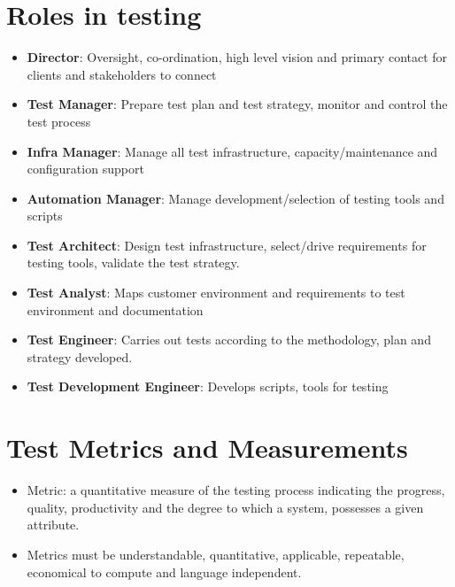 \documentclass{article}
\begin{document}
\section{Roles in testing}
\begin{itemize}
    \item \textbf{Director}: Oversight, co-ordination, high level vision and primary contact for clients and stakeholders to connect
    
    \item \textbf{Test Manager}: Prepare test plan and test strategy, monitor and control the test process
    
    \item \textbf{Infra Manager}: Manage all test infrastructure, capacity/maintenance and configuration support
    
    \item \textbf{Automation Manager}: Manage development/selection of testing tools and scripts
    
    \item \textbf{Test Architect}: Design test infrastructure, select/drive requirements for testing tools, validate the test strategy.
    
    \item \textbf{Test Analyst}: Maps customer environment and requirements to test environment and documentation
    
    \item \textbf{Test Engineer}: Carries out tests according to the methodology, plan and strategy developed. 
    
    \item \textbf{Test Development Engineer}: Develops scripts, tools for testing
\end{itemize}

\section{Test Metrics and Measurements}
\begin{itemize}
    \item Metric: a quantitative measure of the testing process indicating the progress, quality, productivity and the degree to which a system, possesses a given attribute. 
    
    \item Metrics must be understandable, quantitative, applicable, repeatable, economical to compute and language independent.
\end{itemize}
\end{document}
